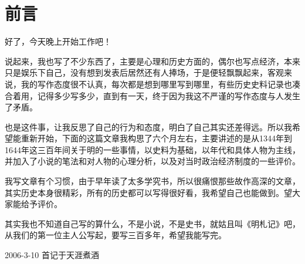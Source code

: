 \fancyhead[RO]{{\tiny{\textcolor{Gray}{\faQuoteRight\ }}}\thepage}
\fancyhead[LE]{{\tiny{\textcolor{Gray}{\faQuoteRight\ }}}\thepage}
\fancyfoot[LE,RO]{}
\fancyfoot[LO,CE]{}
\fancyfoot[CO,RE]{}
\chapter*{前言}
\ifnum{}
	\begin{multicols}{\theparacolNo}
		\fi
		好了，今天晚上开始工作吧！

		说起来，我也写了不少东西了，主要是心理和历史方面的，偶尔也写点经济，本来只是娱乐下自己，没有想到发表后居然还有人捧场，于是便轻飘飘起来，客观来说，我的写作态度很不认真，每次都是想到哪里写到哪里，有些历史史料记录也凑合着用，记得多少写多少，直到有一天，终于因为我这不严谨的写作态度与人发生了矛盾。

		也是这件事，让我反思了自己的行为和态度，明白了自己其实还差得远。所以我希望能重新开始，下面的这篇文章我构思了六个月左右，主要讲述的是从1344年到1644年这三百年间关于明的一些事情，以史料为基础，以年代和具体人物为主线，并加入了小说的笔法和对人物的心理分析，以及对当时政治经济制度的一些评价。

		我写文章有个习惯，由于早年读了太多学究书，所以很痛恨那些故作高深的文章，其实历史本身很精彩，所有的历史都可以写得很好看，我希望自己也能做到。望大家能给予评价。

		其实我也不知道自己写的算什么，不是小说，不是史书，就姑且叫《明札记》吧，从我们的第一位主人公写起，要写三百多年，希望我能写完。

		\begin{flushright}
			2006-3-10
			首记于天涯煮酒
		\end{flushright}
		\ifnum{}
	\end{multicols}
\fi
